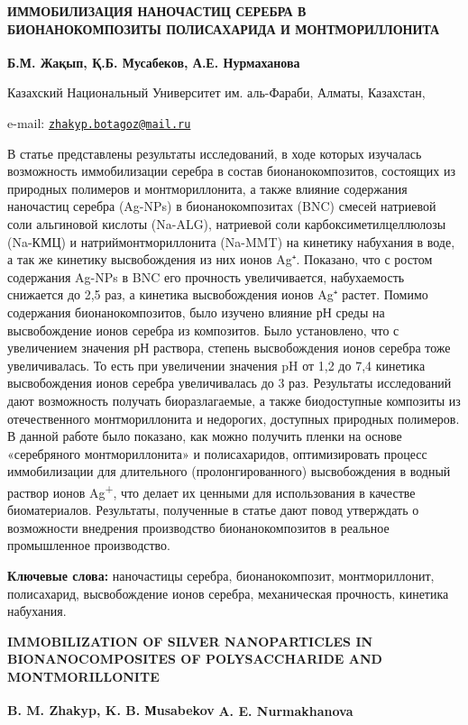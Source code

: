 \begin{articleheader}
{\bfseries ИММОБИЛИЗАЦИЯ НАНОЧАСТИЦ СЕРЕБРА В БИОНАНОКОМПОЗИТЫ ПОЛИСАХАРИДА
И МОНТМОРИЛЛОНИТА}

{\bfseries Б.М. Жақып\textsuperscript{\envelope }, Қ.Б. Мусабеков, А.Е. Нурмаханова}
\end{articleheader}

\begin{affiliation}
Казахский Национальный Университет им. аль-Фараби, Алматы, Казахстан,

e-mail: \href{mailto:zhakyp.botagoz@mail.ru}{\nolinkurl{zhakyp.botagoz@mail.ru}}
\end{affiliation}

В статье представлены результаты исследований, в ходе которых изучалась
возможность иммобилизации серебра в состав бионанокомпозитов, состоящих
из природных полимеров и монтмориллонита, а также влияние содержания
наночастиц серебра (Ag-NPs) в бионанокомпозитах (BNC) смесей натриевой
соли альгиновой кислоты (Na-ALG), натриевой соли карбоксиметилцеллюлозы
(Na-КМЦ) и натриймонтмориллонита (Na-MMT) на кинетику набухания в воде,
а так же кинетику высвобождения из них ионов Ag⁺. Показано, что с ростом
содержания Ag-NPs в BNC его прочность увеличивается, набухаемость
снижается до 2,5 раз, а кинетика высвобождения ионов Ag⁺ растет. Помимо
содержания бионанокомпозитов, было изучено влияние рН среды на
высвобождение ионов серебра из композитов. Было установлено, что с
увеличением значения рН раствора, степень высвобождения ионов серебра
тоже увеличивалась. То есть при увеличении значения pH от 1,2 до 7,4
кинетика высвобождения ионов серебра увеличивалась до 3 раз. Результаты
исследований дают возможность получать биоразлагаемые, а также
биодоступные композиты из отечественного монтмориллонита и недорогих,
доступных природных полимеров. В данной работе было показано, как можно
получить пленки на основе «серебряного монтмориллонита» и полисахаридов,
оптимизировать процесс иммобилизации для длительного (пролонгированного)
высвобождения в водный раствор ионов Ag\textsuperscript{+}, что делает
их ценными для использования в качестве биоматериалов. Результаты,
полученные в статье дают повод утверждать о возможности внедрения
производство бионанокомпозитов в реальное промышленное производство.

{\bfseries Ключевые слова:} наночастицы серебра, бионанокомпозит,
монтмориллонит, полисахарид, высвобождение ионов серебра, механическая
прочность, кинетика набухания.

\begin{articleheader}
{\bfseries IMMOBILIZATION OF SILVER NANOPARTICLES IN BIONANOCOMPOSITES OF
POLYSACCHARIDE AND MONTMORILLONITE}

{\bfseries B. M. Zhakyp\textsuperscript{\envelope }, K. B. Мusabekov} {\bfseries A. E.
Nurmakhanova}
\end{articleheader}


